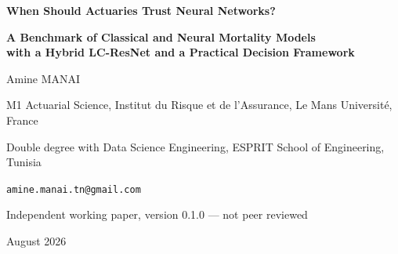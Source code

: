 \documentclass[11pt,a4paper]{article}
\begin{document}
\begin{center}
{\LARGE\bfseries When Should Actuaries Trust Neural Networks?\par}
\vspace{6pt}
{\large\bfseries A Benchmark of Classical and Neural Mortality Models\\
with a Hybrid LC-ResNet and a Practical Decision Framework\par}
\vspace{14pt}
{\normalsize Amine MANAI\par}
\vspace{2pt}
{\small M1 Actuarial Science, Institut du Risque et de l'Assurance, Le Mans Universit\'e, France\par}
{\small Double degree with Data Science Engineering, ESPRIT School of Engineering, Tunisia\par}
{\small\texttt{amine.manai.tn@gmail.com}\par}
\vspace{5pt}
{\small Independent working paper, version 0.1.0 --- not peer reviewed\par}
{\small August 2026\par}
\end{center}

\vspace{10pt}
\end{document}
